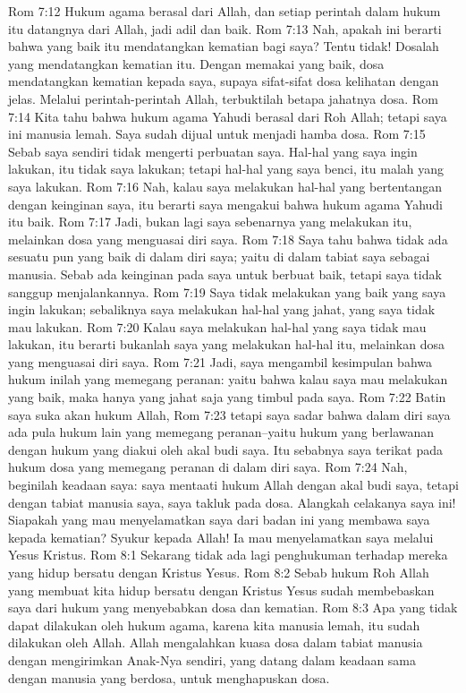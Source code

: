 Rom 7:12  Hukum agama berasal dari Allah, dan setiap perintah dalam hukum itu datangnya dari Allah, jadi adil dan baik.
Rom 7:13  Nah, apakah ini berarti bahwa yang baik itu mendatangkan kematian bagi saya? Tentu tidak! Dosalah yang mendatangkan kematian itu. Dengan memakai yang baik, dosa mendatangkan kematian kepada saya, supaya sifat-sifat dosa kelihatan dengan jelas. Melalui perintah-perintah Allah, terbuktilah betapa jahatnya dosa.
Rom 7:14  Kita tahu bahwa hukum agama Yahudi berasal dari Roh Allah; tetapi saya ini manusia lemah. Saya sudah dijual untuk menjadi hamba dosa.
Rom 7:15  Sebab saya sendiri tidak mengerti perbuatan saya. Hal-hal yang saya ingin lakukan, itu tidak saya lakukan; tetapi hal-hal yang saya benci, itu malah yang saya lakukan.
Rom 7:16  Nah, kalau saya melakukan hal-hal yang bertentangan dengan keinginan saya, itu berarti saya mengakui bahwa hukum agama Yahudi itu baik.
Rom 7:17  Jadi, bukan lagi saya sebenarnya yang melakukan itu, melainkan dosa yang menguasai diri saya.
Rom 7:18  Saya tahu bahwa tidak ada sesuatu pun yang baik di dalam diri saya; yaitu di dalam tabiat saya sebagai manusia. Sebab ada keinginan pada saya untuk berbuat baik, tetapi saya tidak sanggup menjalankannya.
Rom 7:19  Saya tidak melakukan yang baik yang saya ingin lakukan; sebaliknya saya melakukan hal-hal yang jahat, yang saya tidak mau lakukan.
Rom 7:20  Kalau saya melakukan hal-hal yang saya tidak mau lakukan, itu berarti bukanlah saya yang melakukan hal-hal itu, melainkan dosa yang menguasai diri saya.
Rom 7:21  Jadi, saya mengambil kesimpulan bahwa hukum inilah yang memegang peranan: yaitu bahwa kalau saya mau melakukan yang baik, maka hanya yang jahat saja yang timbul pada saya.
Rom 7:22  Batin saya suka akan hukum Allah,
Rom 7:23  tetapi saya sadar bahwa dalam diri saya ada pula hukum lain yang memegang peranan--yaitu hukum yang berlawanan dengan hukum yang diakui oleh akal budi saya. Itu sebabnya saya terikat pada hukum dosa yang memegang peranan di dalam diri saya.
Rom 7:24  Nah, beginilah keadaan saya: saya mentaati hukum Allah dengan akal budi saya, tetapi dengan tabiat manusia saya, saya takluk pada dosa. Alangkah celakanya saya ini! Siapakah yang mau menyelamatkan saya dari badan ini yang membawa saya kepada kematian? Syukur kepada Allah! Ia mau menyelamatkan saya melalui Yesus Kristus.
Rom 8:1  Sekarang tidak ada lagi penghukuman terhadap mereka yang hidup bersatu dengan Kristus Yesus.
Rom 8:2  Sebab hukum Roh Allah yang membuat kita hidup bersatu dengan Kristus Yesus sudah membebaskan saya dari hukum yang menyebabkan dosa dan kematian.
Rom 8:3  Apa yang tidak dapat dilakukan oleh hukum agama, karena kita manusia lemah, itu sudah dilakukan oleh Allah. Allah mengalahkan kuasa dosa dalam tabiat manusia dengan mengirimkan Anak-Nya sendiri, yang datang dalam keadaan sama dengan manusia yang berdosa, untuk menghapuskan dosa.
